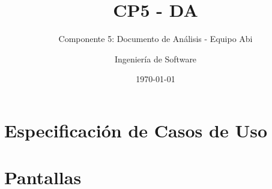 \documentclass[10pt]{book}
\title{CP5 - DA}
\subtitle{Componente 5: Documento de Análisis - Equipo Abi}
\author{Ingeniería de Software}
\date{\today}
\begin{document}
\maketitle
\thispagestyle{empty}
\tableofcontents





\chapter{Especificación de Casos de Uso}

%



%
\chapter{Pantallas}

\end{document}

